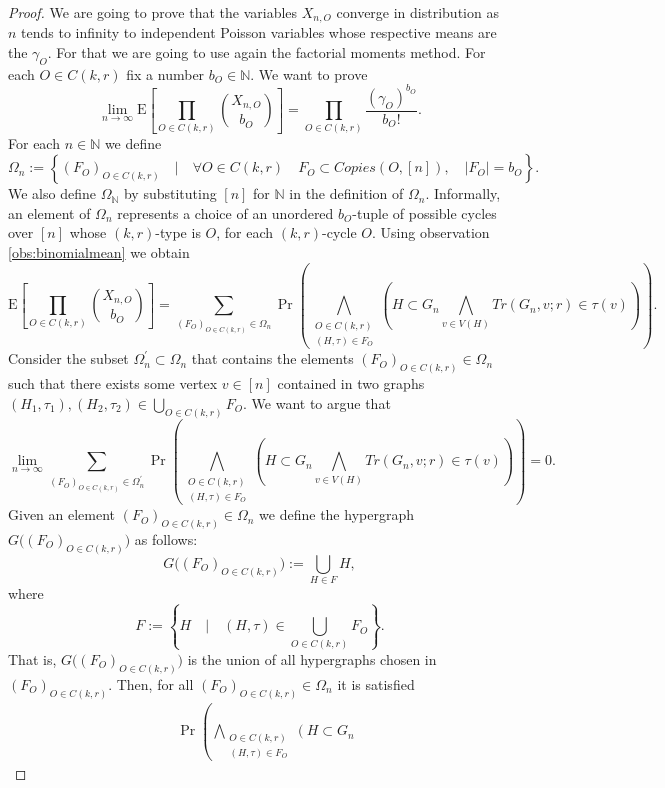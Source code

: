 \documentclass[12pt,notitlepage,a4paper]{article}
\theoremstyle{definition}
\newcommand{\N}{\mathbb{N}}
\newcommand{\Ln}{\lim\limits_{n\to \infty}}
\begin{document}
\begin{proof}
	We are going to prove that the variables $X_{n,O}$ converge
	in distribution as $n$ tends to infinity to 
	independent Poisson variables whose respective means are
	the $\gamma_O$. For that we are going to use again the factorial 
	moments method. For each $O\in C(k,r)$ fix a number $b_{O}\in\N$.
	We want to prove 
	\[
	\Ln 
	\mathrm{E}\left[
	\prod_{O\in C(k,r)}
	\binom{X_{n,O}}{b_O}
	\right]= \prod_{O\in C(k,r)} 
	\frac{(\gamma_O)^{b_O}}{b_O!}.
	\]
	For each $n\in \N$ we define
	\[
	\Omega_n:=\left\{
	(F_O)_{O\in C(k,r)} \quad \Big|
	\quad \forall O\in C(k,r) \quad
	F_O\subset Copies(O,[n]), \quad
	|F_O|=b_O	
	\right\}.
	\]
	We also define $\Omega_\N$ by substituting $[n]$ for $\N$ in
	the definition of $\Omega_n$. Informally, an element of $\Omega_n$ 
	represents a choice of an unordered $b_O$-tuple
	of possible cycles over $[n]$ whose $(k,r)$-type is $O$, for each
	$(k,r)$-cycle $O$. Using observation \cref{obs:binomialmean} we obtain
	\[
	\mathrm{E}\left[
	\prod_{O\in C(k,r)}
	\binom{X_{n,O}}{b_O}
	\right]=
	\sum_{(F_O)_{O\in C(k,r)}\in \Omega_n}
	\Pr\left(
	\bigwedge_{
	\substack{
	O\in C(k,r)\\
	(H,\tau)\in F_O
	}}
	\left(
	H\subset G_n
	\bigwedge_{v\in V(H)}
	Tr(G_n,v;r)\in \tau(v)
	\right)
	\right).
	\]
	Consider the subset $\Omega_n^\prime\subset \Omega_n$ that contains
	the elements $(F_O)_{O\in C(k,r)}\in \Omega_n$ such that there exists
	some vertex $v\in [n]$ contained in two graphs
	$(H_1,\tau_1),(H_2,\tau_2)\in \bigcup_{O\in C(k,r)} F_O$. We want to argue 
	that
	\begin{equation}\label{eqn:denseconfigurations}
	\Ln
	\sum_{(F_O)_{O\in C(k,r)}\in \Omega_n^\prime}
	\Pr\left(
	\bigwedge_{
		\substack{
			O\in C(k,r)\\
			(H,\tau)\in F_O
	}}
	\left(
	H\subset G_n
	\bigwedge_{v\in V(H)}
	Tr(G_n,v;r)\in \tau(v)
	\right)
	\right)=0.
	\end{equation}
	Given an element $(F_O)_{O\in C(k,r)}\in \Omega_n$ we 
	define the hypergraph $G\Big((F_O)_{O\in C(k,r)}\Big)$ as
	follows:
	\[
	G\Big((F_O)_{O\in C(k,r)}\Big):=
	\bigcup_{H\in F} H, 
	\]
	where
	\[
	F:=\left\{
	H \quad \Big| \quad 
	(H,\tau)\in \bigcup_{O\in C(k,r)} F_O	
	\right\}.
	\]
	That is, $G\Big((F_O)_{O\in C(k,r)}\Big)$
	is the union of all hypergraphs chosen in 
	$(F_O)_{O\in C(k,r)}$. Then, for all 
	$(F_O)_{O\in C(k,r)}\in \Omega_n$ it is 
	satisfied
	\begin{align*}
	&\Pr\left(
	\bigwedge_{
		\substack{
			O\in C(k,r)\\
			(H,\tau)\in F_O
	}}
	\left(
	H\subset G_n

\end{align*}
\end{proof}
\end{document}
